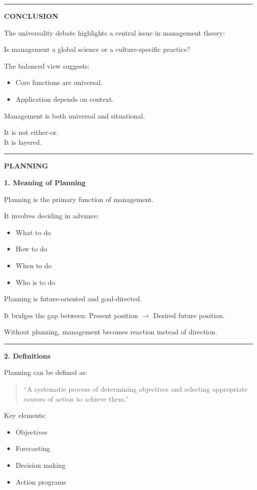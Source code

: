 \documentclass[10pt,a4paper]{article}
\newcommand{\separator}{\vspace{0.4em}\noindent\rule{\linewidth}{0.6pt}\vspace{0.4em}}
\begin{document}
\separator

\textbf{CONCLUSION}

The universality debate highlights a central issue in management theory:

Is management a global science or a culture-specific practice?

The balanced view suggests:
\begin{itemize}
  \item Core functions are universal.
  \item Application depends on context.
\end{itemize}

Management is both universal and situational.

It is not either-or.\\
It is layered.

\separator

\begin{center}
  \large\textbf{PLANNING}
\end{center}

\textbf{1. Meaning of Planning}

Planning is the primary function of management.

It involves deciding in advance:
\begin{itemize}
  \item What to do
  \item How to do
  \item When to do
  \item Who is to do
\end{itemize}

Planning is future-oriented and goal-directed.

It bridges the gap between: Present position $\rightarrow$ Desired future position.

Without planning, management becomes reaction instead of direction.

\separator

\textbf{2. Definitions}

Planning can be defined as:

\begin{quote}
``A systematic process of determining objectives and selecting appropriate courses of action
to achieve them.''
\end{quote}

Key elements:
\begin{itemize}
  \item Objectives
  \item Forecasting
  \item Decision making
  \item Action programs
\end{itemize}
\end{document}
